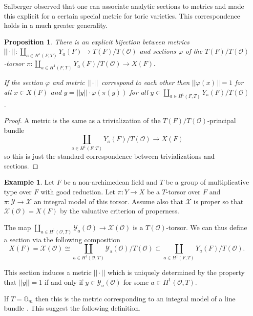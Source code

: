 \documentclass[a4paper,11pt,reqno]{amsart}
\newcommand{\G}{\mathbb{G}}
\newtheorem{proposition}[theorem]{Proposition}
\theoremstyle{definition}
\newtheorem{example}[theorem]{Example}
\begin{document}
Salberger \cite[\S 9]{Salberger1998Tamagawa} observed that one can associate analytic sections to metrics and made this explicit for a certain special metric for toric varieties. This correspondence holds in a much greater generality.
\begin{proposition}
	There is an explicit bijection between metrics $||\cdot||: \coprod_{a \in H^1(F, T)} Y_{a}(F) \to T(F)/T(\mathcal{O})$ and sections $\varphi$ of the $T(F)/T(\mathcal{O})$-torsor $\pi: \coprod_{a \in H^1(F, T)} Y_{a}(F)/T(\mathcal{O}) \to X(F)$.
	
	If the section $\varphi$ and metric $||\cdot||$ correspond to each other then $|| \varphi (x)|| = 1$ for all $x \in X(F)$ and $y = ||y|| \cdot \varphi(\pi(y))$ for all $y \in \coprod_{a \in H^1(F, T)} Y_{a}(F)/T(\mathcal{O})$.
\end{proposition}
\begin{proof}
	A metric is the same as a trivialization of the $T(F)/T(\mathcal{O})$-principal bundle 
	\[
	\coprod_{a \in H^1(F, T)} Y_{a}(F)/T(\mathcal{O}) \to X(F)
	\]
	so this is just the standard correspondence between trivializations and sections.
\end{proof}
\begin{example}
	Let $F$ be a non-archimedean field and $T$ be a group of multiplicative type over $F$ with good reduction. Let $\pi: Y \to X$ be a $T$-torsor over $F$ and $\pi: \mathcal{Y} \to \mathcal{X}$ an integral model of this torsor. Assume also that $\mathcal{X}$ is proper so that $\mathcal{X}(\mathcal{O}) = X(F)$ by the valuative criterion of properness.
	
	The map $\coprod_{a \in H^1(\mathcal{O}, T)} \mathcal{Y}_{a}(\mathcal{O}) \to \mathcal{X}(\mathcal{O})$ is a $T(\mathcal{O})$-torsor. We can thus define a section via the following composition
	\begin{equation*}
		X(F) = \mathcal{X}(\mathcal{O}) \cong \coprod_{a \in H^1(\mathcal{O}, T)} \mathcal{Y}_{a}(\mathcal{O})/ T(\mathcal{O}) \subset \coprod_{a \in H^1(F, T)} Y_{a}(F)/T(\mathcal{O}).
	\end{equation*}

	This section induces a metric $||\cdot||$ which is uniquely determined by the property that $||y|| = 1$ if and only if $y \in \mathcal{Y}_{a}(\mathcal{O})$ for some $a \in H^1(\mathcal{O}, T)$.
\end{example}
If $T = \G_m$ then this is the metric corresponding to an integral model of a line bundle \cite[\S2.1.5]{Chambert-Loir2010Igusa}. This suggest the following definition.
\end{document}
